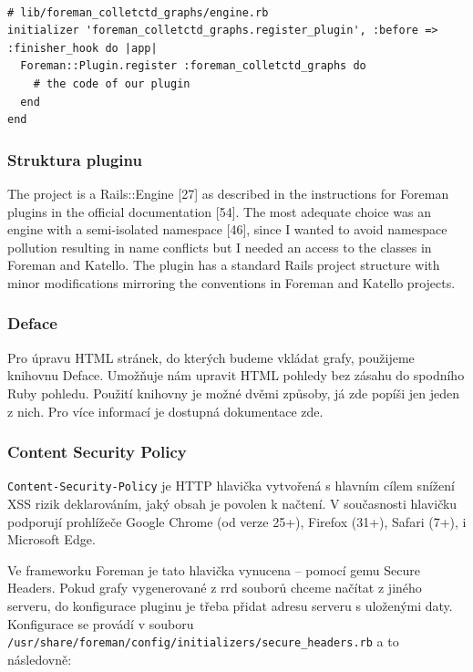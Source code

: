 \documentclass[thesis=B,czech]{FITthesis}[2012/06/26]
\begin{document}
\begin{verbatim}

# lib/foreman_colletctd_graphs/engine.rb
initializer 'foreman_colletctd_graphs.register_plugin', :before => :finisher_hook do |app|
  Foreman::Plugin.register :foreman_colletctd_graphs do
    # the code of our plugin
  end
end
\end{verbatim}

\subsubsection{Struktura pluginu}

The project is a Rails::Engine [27] as described in the instructions for Foreman plugins
in the official documentation [54]. The most adequate choice was an engine with a
semi-isolated namespace [46], since I wanted to avoid namespace pollution resulting in
name conflicts but I needed an access to the classes in Foreman and Katello. The plugin
has a standard Rails project structure with minor modifications mirroring the conventions
in Foreman and Katello projects.
\subsubsection{Deface}

Pro úpravu HTML stránek, do kterých budeme vkládat grafy, použijeme knihovnu Deface. Umožňuje nám upravit HTML pohledy bez zásahu do spodního Ruby pohledu. Použití knihovny je možné dvěmi způsoby, já zde popíši jen jeden z nich. Pro více informací je dostupná dokumentace zde.


\subsubsection{Content Security Policy}

\texttt{Content-Security-Policy} je HTTP hlavička vytvořená s hlavním cílem snížení XSS rizik deklarováním, jaký obsah je povolen k načtení. V současnosti hlavičku podporují prohlížeče Google Chrome (od verze 25+), Firefox (31+), Safari (7+), i Microsoft Edge.

Ve frameworku Foreman je tato hlavička vynucena -- pomocí gemu Secure Headers. Pokud grafy vygenerované z rrd souborů chceme načítat z jiného serveru, do konfigurace pluginu je třeba přidat adresu serveru s uloženými daty. Konfigurace se provádí v souboru \texttt{/usr/share/foreman/config/initializers/secure_headers.rb} a to následovně:
\end{document}

